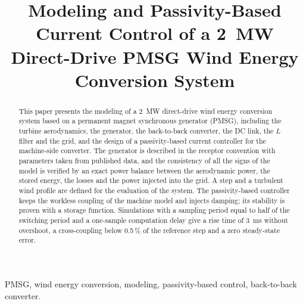 \documentclass[conference]{IEEEtran}
\begin{document}
\title{Modeling and Passivity-Based Current Control of a 2~MW Direct-Drive PMSG Wind Energy Conversion System}

\author{
\and
{}
\and
{}
}

\maketitle

\begin{abstract}
This paper presents the modeling of a 2~MW direct-drive wind energy conversion system based on a
permanent magnet synchronous generator (PMSG), including the turbine aerodynamics, the generator, the
back-to-back converter, the DC link, the $L$ filter and the grid, and the design of a passivity-based
current controller for the machine-side converter. The generator is described in the receptor
convention with parameters taken from published data, and the consistency of all the signs of the
model is verified by an exact power balance between the aerodynamic power, the stored energy, the
losses and the power injected into the grid. A step and a turbulent wind profile are defined for the
evaluation of the system. The passivity-based controller keeps the workless coupling of the machine
model and injects damping; its stability is proven with a storage function. Simulations with a
sampling period equal to half of the switching period and a one-sample computation delay give a rise
time of 3~ms without overshoot, a cross-coupling below 0.5\,\% of the reference step and a zero
steady-state error.
\end{abstract}

\begin{IEEEkeywords}
PMSG, wind energy conversion, modeling, passivity-based control, back-to-back converter.
\end{IEEEkeywords}
\end{document}
